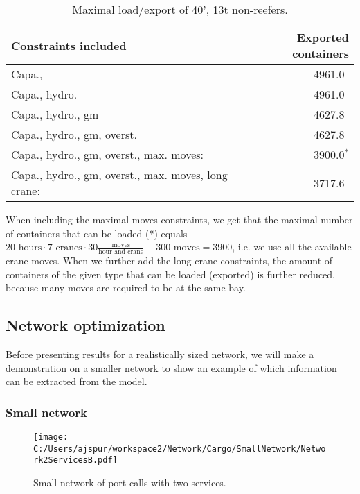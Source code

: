 \begin{table}[htbp]
\begin{small}
\begin{center}
\begin{tabular}{l|r}
Constraints included						  									&Exported containers\\
\hline
Capa., 																							&4961.0$\phantom{^{*}}$\\
Capa., hydro. 																			&4961.0$\phantom{^{*}}$\\
Capa., hydro., gm																		&4627.8$\phantom{^{*}}$\\
Capa., hydro., gm, overst.													&4627.8$\phantom{^{*}}$\\
Capa., hydro., gm, overst., max. moves:							&3900.0$^{*}$\\ 
Capa., hydro., gm, overst., max. moves, long crane:	&3717.6$\phantom{^{*}}$\\
\end{tabular}
\caption{Maximal load/export of 40', 13t non-reefers.}\label{tab:resultsPS}
\end{center}
\end{small}
\end{table}

When including the maximal moves-constraints, we get that the maximal number of containers that can be loaded (*) equals $20\text{ hours}\cdot7\text{ cranes}\cdot 30 \frac{\text{moves}}{\text{hour and crane}} - 300 \text{ moves} = 3900$, i.e. we use all the available crane moves.  
When we further add the long crane constraints, the amount of containers of the given type that can be loaded (exported) is further reduced, because many moves are required to be at the same bay.

\subsection{Network optimization}
Before presenting results for a realistically sized network, we will make a demonstration on a smaller network to show an example of which information can be extracted from the model. 
\subsubsection{Small network}

\begin{figure}[htbp]
	\begin{center}
		\texttt{[image: C:/Users/ajspur/workspace2/Network/Cargo/SmallNetwork/Network2ServicesB.pdf]}
	\caption{Small network of port calls with two services.}
	\label{fig:Network2ServicesB}
	\end{center}
\end{figure}

